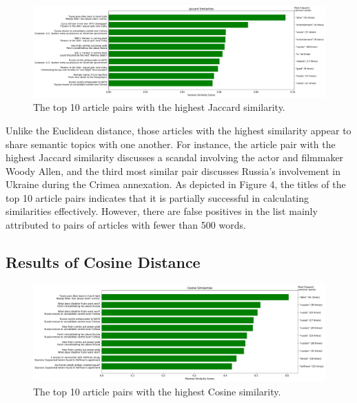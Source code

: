 \documentclass[11pt]{article}
\begin{document}
\begin{figure}[h] \label{fig:jaccard}
  \centering
  \includegraphics[width=\textwidth]{figures/jaccard_most_sim}
  \caption{The top 10 article pairs with the highest Jaccard similarity.}
\end{figure}

Unlike the Euclidean distance, those articles with the highest similarity appear to share semantic topics with one another.
For instance, the article pair with the highest Jaccard similarity discusses a scandal involving the actor and filmmaker Woody Allen, and the third most similar pair discusses Russia's involvement in Ukraine during the Crimea annexation.
As depicted in Figure 4, the titles of the top 10 article pairs indicates that it is partially successful in calculating similarities effectively.
However, there are false positives in the list mainly attributed to pairs of articles with fewer than 500 words.

\subsection{Results of Cosine Distance}

\begin{figure}[h] \label{fig:cosine}
  \centering
  \includegraphics[width=\textwidth]{figures/cosine_most_sim}
  \caption{The top 10 article pairs with the highest Cosine similarity.}
\end{figure}
\end{document}
